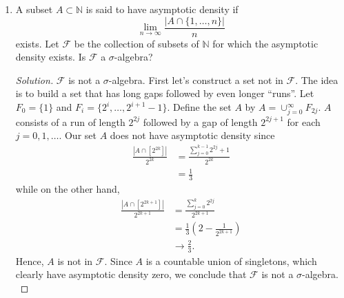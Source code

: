 \documentclass[11pt,letterpaper]{report}
\newcommand{\naturals}{\mathbb{N}}
\newcommand{\mcal}[1]{\mathcal{#1}}
\newenvironment{solution}
{\begin{proof}[Solution]}
{\end{proof}}
\begin{document}
\begin{enumerate}
\begin{enumerate}
		\item Let $\mcal{F}$ and $\mcal{G}$ be two $\sigma$-algebras of subsets of $\Omega$. Is $\mcal{F}\cup \mcal{G}$ always a $\sigma$-algebra?
		\begin{solution}
			The union need not be a $\sigma$-algebra. Let $\Omega = \{1, 2, 3, 4\}$, $\mcal{F} = \{\emptyset, \Omega, \{1\}, \{2, 3, 4\}\}$, and $\mcal{G} = \{\emptyset, \Omega, \{2\}, \{1, 3, 4\}\}$. $\mcal{F}$ and $\mcal{G}$ are $\sigma$-algebras, but the set $\{1\}\cup \{2\} = \{1,2\}$ is not in their union.
		\end{solution}
	\end{enumerate}

	\item A subset $A\subset \naturals$ is said to have asymptotic density if
	\[
	\lim_{n\to \infty}\frac{|A\cap \{1, \ldots, n\}|}{n}
	\]
	exists. Let $\mcal{F}$ be the collection of subsets of $\naturals$ for which the asymptotic density exists. Is $\mcal{F}$ a $\sigma$-algebra?
	\begin{solution}
		$\mcal{F}$ is not a $\sigma$-algebra. First let's construct a set not in $\mcal{F}$. The idea is to build a set that has long gaps followed by even longer ``runs''. Let $F_0 = \{1\}$ and $F_i = \{2^i, \ldots, 2^{i+1}-1\}$. Define the set $A$ by $A = \cup_{j=0}^\infty F_{2j}$. $A$ consists of a run of length $2^{2j}$ followed by a gap of length $2^{2j+1}$ for each $j = 0, 1, \ldots$. Our set $A$ does not have asymptotic density since
		\begin{align*}
			\frac{|A\cap [2^{2k}]|}{2^{2k}} &= \frac{\sum_{j=0}^{k-1}2^{2j}+1}{2^{2k}}\\
			&= \frac{1}{3}
		\end{align*}
		while on the other hand,
		\begin{align*}
			\frac{|A\cap [2^{2k+1}]|}{2^{2k+1}} &= \frac{\sum_{j=0}^{k}2^{2j}}{2^{2k+1}}\\
			&= \frac{1}{3}\left(2 - \frac{1}{2^{2k+1}}\right)\\
			&\to \frac{2}{3}.
		\end{align*}
		Hence, $A$ is not in $\mcal{F}$. Since $A$ is a countable union of singletons, which clearly have asymptotic density zero, we conclude that $\mcal{F}$ is not a $\sigma$-algebra.\\
	\end{solution}


\end{enumerate}
\end{document}
